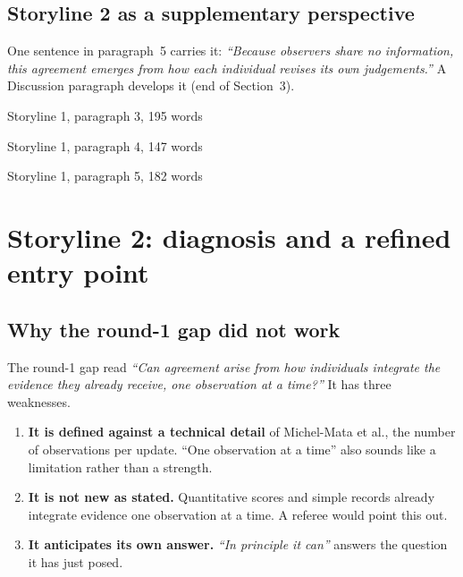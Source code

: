 \documentclass[11pt]{article}
\newcommand{\old}[1]{\textit{``#1''}}
\begin{document}
\subsection*{Storyline 2 as a supplementary perspective}
One sentence in paragraph~5 carries it: \emph{``Because observers share no information, this agreement emerges from how each individual revises its own judgements.''} A Discussion paragraph develops it (end of Section~3).

\begin{draft}{Storyline 1, paragraph 3, 195 words}

\end{draft}
\begin{draft}{Storyline 1, paragraph 4, 147 words}

\end{draft}
\begin{draft}{Storyline 1, paragraph 5, 182 words}

\end{draft}

\section{Storyline 2: diagnosis and a refined entry point}

\subsection*{Why the round-1 gap did not work}
The round-1 gap read \old{Can agreement arise from how individuals integrate the evidence they already receive, one observation at a time?} It has three weaknesses.
\begin{enumerate}[leftmargin=1.5em]
\item \textbf{It is defined against a technical detail} of Michel-Mata et al.\cite{michelmata2024}, the number of observations per update. ``One observation at a time'' also sounds like a limitation rather than a strength.
\item \textbf{It is not new as stated.} Quantitative scores and simple records already integrate evidence one observation at a time\cite{schmid2023,clark2020}. A referee would point this out.
\item \textbf{It anticipates its own answer.} \old{In principle it can} answers the question it has just posed.
\end{enumerate}
\end{document}
